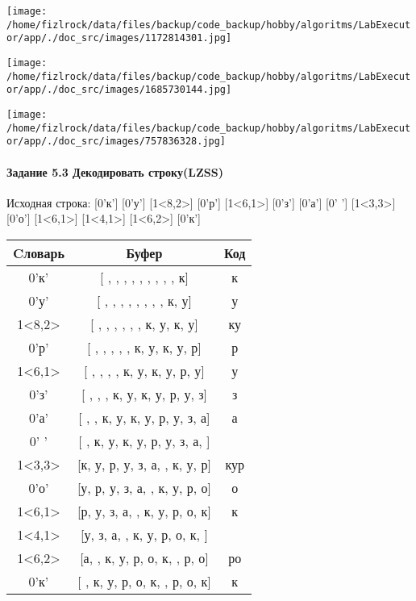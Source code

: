 \documentclass[a4paper, 12pt]{article}
\begin{document}
\texttt{[image: /home/fizlrock/data/files/backup/code\_backup/hobby/algoritms/LabExecutor/app/./doc\_src/images/1172814301.jpg]}

\texttt{[image: /home/fizlrock/data/files/backup/code\_backup/hobby/algoritms/LabExecutor/app/./doc\_src/images/1685730144.jpg]}

\texttt{[image: /home/fizlrock/data/files/backup/code\_backup/hobby/algoritms/LabExecutor/app/./doc\_src/images/757836328.jpg]}
\pagebreak
\paragraph{Задание 5.3 Декодировать строку(LZSS)\\}

Исходная строка: [0'к'] [0'у'] [1<8,2>] [0'р'] [1<6,1>] [0'з'] [0'а'] [0' '] [1<3,3>] [0'о'] [1<6,1>] [1<4,1>] [1<6,2>] [0'к']\\
\begin{table}[h!]
\centering
\begin{tabular}{|c|c|c|}
\hline
 Cловарь & Буфер & Код  \\ \hline
0'к' & [ ,  ,  ,  ,  ,  ,  ,  ,  , к] & к
\\ \hline
0'у' & [ ,  ,  ,  ,  ,  ,  ,  , к, у] & у
\\ \hline
1<8,2> & [ ,  ,  ,  ,  ,  , к, у, к, у] & ку
\\ \hline
0'р' & [ ,  ,  ,  ,  , к, у, к, у, р] & р
\\ \hline
1<6,1> & [ ,  ,  ,  , к, у, к, у, р, у] & у
\\ \hline
0'з' & [ ,  ,  , к, у, к, у, р, у, з] & з
\\ \hline
0'а' & [ ,  , к, у, к, у, р, у, з, а] & а
\\ \hline
0' ' & [ , к, у, к, у, р, у, з, а,  ] &  
\\ \hline
1<3,3> & [к, у, р, у, з, а,  , к, у, р] & кур
\\ \hline
0'о' & [у, р, у, з, а,  , к, у, р, о] & о
\\ \hline
1<6,1> & [р, у, з, а,  , к, у, р, о, к] & к
\\ \hline
1<4,1> & [у, з, а,  , к, у, р, о, к,  ] &  
\\ \hline
1<6,2> & [а,  , к, у, р, о, к,  , р, о] & ро
\\ \hline
0'к' & [ , к, у, р, о, к,  , р, о, к] & к
\\ \hline
\end{tabular}
\end{table}
\end{document}

